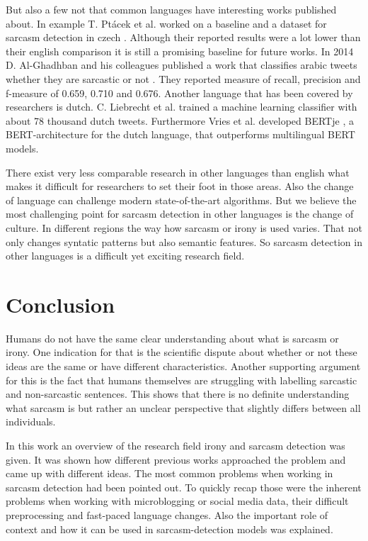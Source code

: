 \documentclass[sigconf,  review=false, nonacm=true]{acmart}
\begin{document}
But also a few not that common languages have interesting works published about. In example T. Ptácek et al. worked on a baseline and a dataset for sarcasm detection in czech \cite{czech}. Although their reported results were a lot lower than their english comparison it is still a promising baseline for future works. In 2014 D. Al-Ghadhban and his colleagues published a work that classifies arabic tweets whether they are sarcastic or not \cite{arabic}. They reported measure of recall, precision and f-measure of 0.659, 0.710 and 0.676. Another language that has been covered by researchers is dutch. C. Liebrecht et al. \cite{dutch} trained a machine learning classifier with about 78 thousand dutch tweets. Furthermore Vries et al. developed BERTje \cite{bertje}, a BERT-architecture for the dutch language, that outperforms multilingual BERT models.

There exist very less comparable research in other languages than english what makes it difficult for researchers to set their foot in those areas. Also the change of language can challenge modern state-of-the-art algorithms. But we believe the most challenging point for sarcasm detection in other languages is the change of culture. In different regions the way how sarcasm or irony is used varies. That not only changes syntatic patterns but also semantic features. So sarcasm detection in other languages is a difficult yet exciting research field.


\section{Conclusion}

Humans do not have the same clear understanding about what is sarcasm or irony. One indication for that is the scientific dispute about whether or not these ideas are the same or have different characteristics. Another supporting argument for this is the fact that humans themselves are struggling with labelling sarcastic and non-sarcastic sentences. This shows that there is no definite understanding what sarcasm is but rather an unclear perspective that slightly differs between all individuals.

In this work an overview of the research field irony and sarcasm detection was given. It was shown how different previous works approached the problem and came up with different ideas. The most common problems when working in sarcasm detection had been pointed out. To quickly recap those were the inherent problems when working with microblogging or social media data, their difficult preprocessing and fast-paced language changes. Also the important role of context and how it can be used in sarcasm-detection models was explained. 
\end{document}
